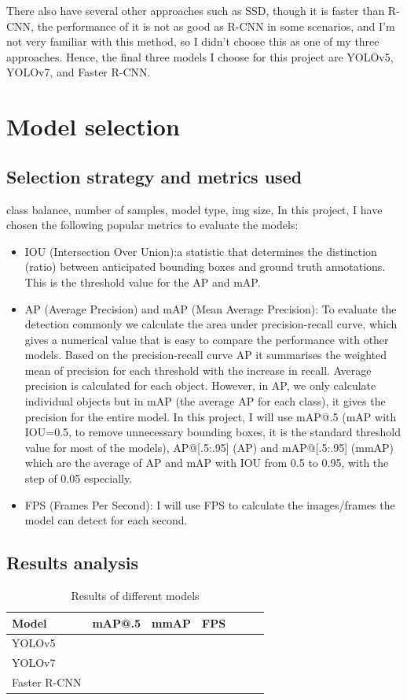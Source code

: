 \documentclass[runningheads]{llncs}
\begin{document}
There also have several other approaches such as SSD, though it is faster than R-CNN, the performance of it is not as good as R-CNN in some scenarios, and I'm not very familiar with this method, so I didn't choose this as one of my three approaches. Hence, the final three models I choose for this project are YOLOv5, YOLOv7, and Faster R-CNN.

\section{Model selection}
\subsection{Selection strategy and metrics used}
class balance, number of samples, model type, img size, 
In this project, I have chosen the following popular metrics to evaluate the models:
\begin{itemize}
  \item IOU (Intersection Over Union):a statistic that determines the distinction (ratio) between anticipated bounding boxes and ground truth annotations. This is the threshold value for the AP and mAP.
  \item AP (Average Precision) and mAP (Mean Average Precision): To evaluate the detection commonly we calculate the area under precision-recall curve, which gives a numerical value that is easy to compare the performance with other models. Based on the precision-recall curve AP it summarises the weighted mean of precision for each threshold with the increase in recall. Average precision is calculated for each object. However, in AP, we only calculate individual objects but in mAP (the average AP for each class), it gives the precision for the entire model. In this project, I will use mAP@.5 (mAP with IOU=0.5, to remove unnecessary bounding boxes, it is the standard threshold value for most of the models), AP@[.5:.95] (AP) and mAP@[.5:.95] (mmAP) which are the average of AP and mAP with IOU from 0.5 to 0.95, with the step of 0.05 especially.
  \item FPS (Frames Per Second): I will use FPS to calculate the images/frames the model can detect for each second.
\end{itemize}


\subsection{Results analysis}
\begin{table}
\caption{Results of different models}\label{tab1}
\begin{tabular}{|l|l|l|l|l|l|l|}
\hline
Model &  mAP@.5 & mmAP & FPS\\
\hline
YOLOv5 & & & \\
YOLOv7 & & & \\
Faster R-CNN & & & \\
\hline
\end{tabular}
\end{table}
\end{document}
